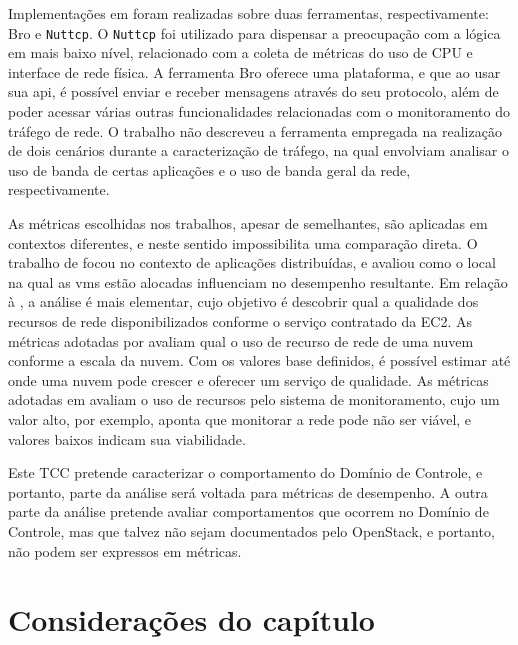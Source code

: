 Implementações em \cite{sharma:2015:hansel,venzano:2013:trafficprivatecloud} foram realizadas sobre duas ferramentas, respectivamente: Bro e \texttt{Nuttcp}.
%
O \texttt{Nuttcp} foi utilizado para dispensar a preocupação com a lógica em mais baixo nível, relacionado com a coleta de métricas do uso de CPU e interface de rede física.
%
A ferramenta Bro oferece uma plataforma, e que ao usar sua \ac{api}, é possível enviar e receber mensagens através do seu protocolo, além de poder acessar várias outras funcionalidades relacionadas com o monitoramento do tráfego de rede.
%
O trabalho \cite{Sciammarella:2016:controltraffic} não descreveu a ferramenta empregada na realização de dois cenários durante a caracterização de tráfego, na qual envolviam analisar o uso de banda de certas aplicações e o uso de banda geral da rede, respectivamente.

As métricas escolhidas nos trabalhos, apesar de semelhantes, são aplicadas em contextos diferentes, e neste sentido impossibilita uma comparação direta. 
%
O trabalho de  focou no contexto de aplicações distribuídas, e avaliou como o local na qual as \acp{vm} estão alocadas influenciam no desempenho resultante.
%
Em relação à , a análise é mais elementar, cujo objetivo é descobrir qual a qualidade dos recursos de rede disponibilizados conforme o serviço contratado da EC2.
%
As métricas adotadas por  avaliam qual o uso de recurso de rede  de uma nuvem conforme a escala da nuvem.
%
Com os valores base definidos, é possível estimar até onde uma nuvem pode crescer e oferecer um serviço de qualidade.
%
As métricas adotadas em  avaliam o uso de recursos pelo sistema de monitoramento, cujo um valor alto, por exemplo, aponta que monitorar a rede pode não ser viável, e valores baixos indicam sua viabilidade.

Este TCC pretende caracterizar o comportamento do Domínio de Controle, e portanto, parte da análise será voltada para métricas de desempenho.
%
A outra parte da análise pretende avaliar comportamentos que ocorrem no Domínio de Controle, mas que talvez não sejam documentados pelo OpenStack, e portanto, não podem ser expressos em métricas.

\section{Considerações do capítulo}
\label{cap2:consideracoes}

